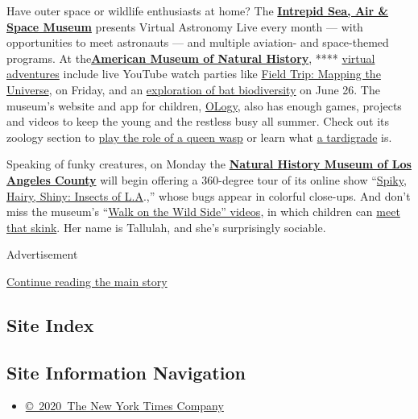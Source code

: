 Have outer space or wildlife enthusiasts at home? The
\textbf{\href{https://www.intrepidmuseum.org/}{Intrepid Sea, Air \&
Space Museum}} presents Virtual Astronomy Live every month --- with
opportunities to meet astronauts --- and multiple aviation- and
space-themed programs. At
the\href{https://www.amnh.org/}{}\textbf{\href{https://www.amnh.org/}{American
Museum of Natural History}}, ****
\href{https://www.amnh.org/explore}{virtual adventures} include live
YouTube watch parties like
\href{https://www.youtube.com/watch?v=lUCC6ae0XZA\&feature=youtu.be}{Field
Trip: Mapping the Universe}, on Friday, and an
\href{https://www.amnh.org/calendar/in-the-field-bats}{exploration of
bat biodiversity} on June 26. The museum's website and app for children,
\href{https://www.amnh.org/explore/ology}{OLogy}, also has enough games,
projects and videos to keep the young and the restless busy all summer.
Check out its zoology section to
\href{https://www.amnh.org/explore/ology/zoology/you-are-the-queen}{play
the role of a queen wasp} or learn what
\href{https://www.amnh.org/explore/ology/zoology/what-s-this-life-at-the-limits}{a
tardigrade} is.

Speaking of funky creatures, on Monday the
\textbf{\href{https://nhm.org/}{Natural History Museum of Los Angeles
County}} will begin offering a 360-degree tour of its online show
``\href{https://nhm.org/spiky-hairy-shiny-insects-la}{Spiky, Hairy,
Shiny: Insects of L.A}.,'' whose bugs appear in colorful close-ups. And
don't miss the museum's ``\href{https://nhmlac.org/connects}{Walk on the
Wild Side'' videos}, in which children can
\href{https://nhmlac.org/stories/chill-out-tallulah-skink}{meet that
skink}. Her name is Tallulah, and she's surprisingly sociable.

Advertisement

\protect\hyperlink{after-bottom}{Continue reading the main story}

\hypertarget{site-index}{%
\subsection{Site Index}\label{site-index}}

\hypertarget{site-information-navigation}{%
\subsection{Site Information
Navigation}\label{site-information-navigation}}

\begin{itemize}
\tightlist
\item
  \href{https://help.nytimes.com/hc/en-us/articles/115014792127-Copyright-notice}{©~2020~The
  New York Times Company}
\end{itemize}

